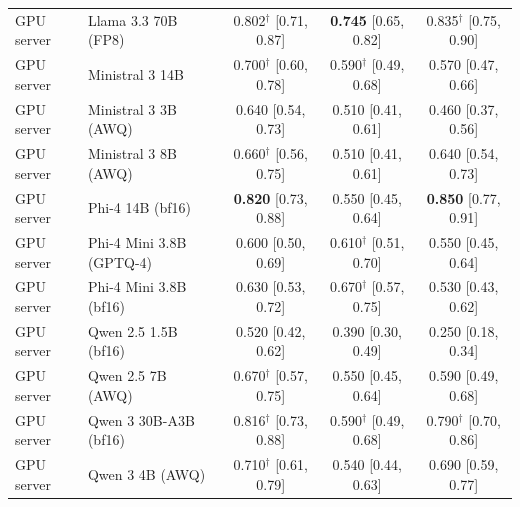 \begin{table}[!t]
\begin{tabularx}{\textwidth}{@{}l L c c c@{}}
GPU server & Llama 3.3 70B (FP8) & 0.802$^{\dagger}$ [0.71, 0.87] & \textbf{0.745} [0.65, 0.82] & 0.835$^{\dagger}$ [0.75, 0.90] \\
GPU server & Ministral 3 14B & 0.700$^{\dagger}$ [0.60, 0.78] & 0.590$^{\dagger}$ [0.49, 0.68] & 0.570 [0.47, 0.66] \\
GPU server & Ministral 3 3B (AWQ) & 0.640 [0.54, 0.73] & 0.510 [0.41, 0.61] & 0.460 [0.37, 0.56] \\
GPU server & Ministral 3 8B (AWQ) & 0.660$^{\dagger}$ [0.56, 0.75] & 0.510 [0.41, 0.61] & 0.640 [0.54, 0.73] \\
GPU server & Phi-4 14B (bf16) & \textbf{0.820} [0.73, 0.88] & 0.550 [0.45, 0.64] & \textbf{0.850} [0.77, 0.91] \\
GPU server & Phi-4 Mini 3.8B (GPTQ-4) & 0.600 [0.50, 0.69] & 0.610$^{\dagger}$ [0.51, 0.70] & 0.550 [0.45, 0.64] \\
GPU server & Phi-4 Mini 3.8B (bf16) & 0.630 [0.53, 0.72] & 0.670$^{\dagger}$ [0.57, 0.75] & 0.530 [0.43, 0.62] \\
GPU server & Qwen 2.5 1.5B (bf16) & 0.520 [0.42, 0.62] & 0.390 [0.30, 0.49] & 0.250 [0.18, 0.34] \\
GPU server & Qwen 2.5 7B (AWQ) & 0.670$^{\dagger}$ [0.57, 0.75] & 0.550 [0.45, 0.64] & 0.590 [0.49, 0.68] \\
GPU server & Qwen 3 30B-A3B (bf16) & 0.816$^{\dagger}$ [0.73, 0.88] & 0.590$^{\dagger}$ [0.49, 0.68] & 0.790$^{\dagger}$ [0.70, 0.86] \\
GPU server & Qwen 3 4B (AWQ) & 0.710$^{\dagger}$ [0.61, 0.79] & 0.540 [0.44, 0.63] & 0.690 [0.59, 0.77] \\
\bottomrule
\end{tabularx}
\end{table}
